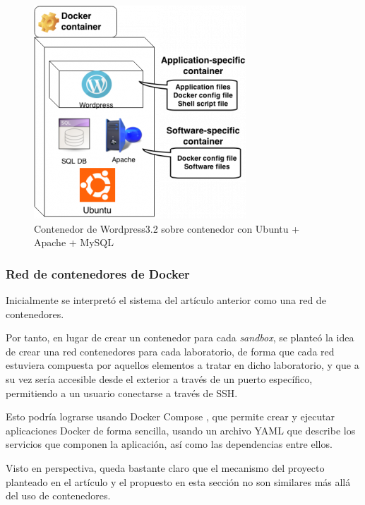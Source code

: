             \begin{figure}[htbp]
                \centering
                \includegraphics[scale=0.75]{images/Diagramas/Articulo.png}
                \caption{Contenedor de Wordpress3.2 sobre contenedor con Ubuntu + Apache + MySQL}
                \label{fig:articulo}
            \end{figure}

            \newpage
            

            \subsubsection{Red de contenedores de Docker}

                Inicialmente se interpretó el sistema del artículo anterior como una red de contenedores.
                
                Por tanto, en lugar de crear un contenedor para cada \textit{sandbox}, se planteó la idea de crear una red contenedores para cada laboratorio, de forma que cada red estuviera compuesta por aquellos elementos a tratar en dicho laboratorio, y que a su vez sería accesible desde el exterior a través de un puerto específico, permitiendo a un usuario conectarse a través de SSH.

                Esto podría lograrse usando Docker Compose \cite{docker-compose}, que permite crear y ejecutar aplicaciones Docker de forma sencilla, usando un archivo YAML que describe los servicios que componen la aplicación, así como las dependencias entre ellos.

                Visto en perspectiva, queda bastante claro que el mecanismo del proyecto planteado en el artículo y el propuesto en esta sección no son similares más allá del uso de contenedores.
                
